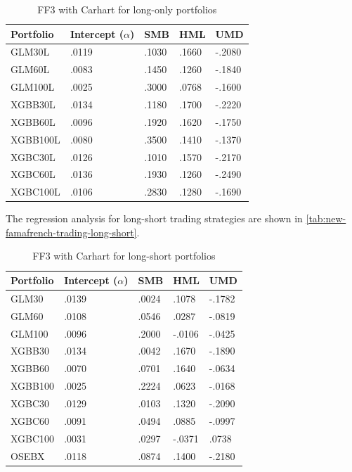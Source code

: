\begin{table}[H]
\centering
\begin{tabularx}{\textwidth}{lXXXX}
\toprule
Portfolio & Intercept ($\alpha$) & SMB & HML & UMD \\
\midrule
GLM30L   & .0119 & .1030 & .1660 & -.2080 \\ 
GLM60L   & .0083 & .1450 & .1260 & -.1840 \\ 
GLM100L  & .0025 & .3000 & .0768 & -.1600 \\ 
XGBB30L  & .0134 & .1180 & .1700 & -.2220 \\ 
XGBB60L  & .0096 & .1920 & .1620 & -.1750 \\ 
XGBB100L & .0080 & .3500 & .1410 & -.1370 \\ 
XGBC30L  & .0126 & .1010 & .1570 & -.2170 \\ 
XGBC60L  & \cellcolor{lightlightgreen} .0136 & .1930 & .1260 & -.2490 \\ 
XGBC100L & .0106 & .2830 & .1280 & -.1690 \\ 
\bottomrule
\end{tabularx}
\vspace{1em}
\caption{FF3 with Carhart for long-only portfolios}
\label{tab:new-famafrench-trading-long-only}
\end{table}

The regression analysis for long-short trading strategies are shown in \autoref{tab:new-famafrench-trading-long-short}.

\begin{table}[H]
\centering
\begin{tabularx}{\textwidth}{lXXXX}
\toprule
Portfolio & Intercept ($\alpha$) & SMB & HML & UMD \\ 
\midrule
GLM30  & \cellcolor{lightlightgreen} .0139 & .0024 & .1078 & -.1782 \\ 
GLM60  & .0108 & .0546 & .0287 & -.0819 \\ 
GLM100 & .0096 & .2000 & -.0106 & -.0425 \\ 
XGBB30 & .0134 & .0042 & .1670 & -.1890 \\ 
XGBB60 & .0070 & .0701 & .1640 & -.0634 \\ 
XGBB100& .0025 & .2224 & .0623 & -.0168 \\ 
XGBC30 & .0129 & .0103 & .1320 & -.2090 \\ 
XGBC60 & .0091 & .0494 & .0885 & -.0997 \\ 
XGBC100& .0031 & .0297 & -.0371 & .0738 \\ 
OSEBX  & .0118 & .0874 & .1400 & -.2180 \\ 
\bottomrule
\end{tabularx}
\vspace{1em}
\caption{FF3 with Carhart for long-short portfolios}
\label{tab:new-famafrench-trading-long-short}
\end{table}





